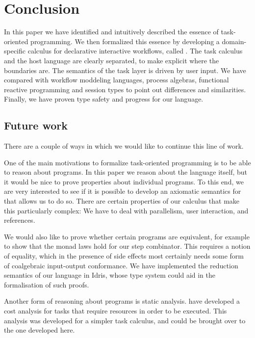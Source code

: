 
\section{Conclusion}

\label{sec:conclusions}

In this paper we have identified and intuitively described the essence of task-oriented programming.
We then formalized this essence by developing a domain-specific calculus for declarative interactive workflows, called \TOPHAT.
The task calculus and the host language are clearly separated, to make explicit where the boundaries are.
The semantics of the task layer is driven by user input.
We have compared \TOPHAT with workflow moddeling languages, process algebras, functional reactive programming and session types to point out differences and similarities.
Finally, we have proven type safety and progress for our language.

\subsection{Future work}

There are a couple of ways in which we would like to continue this line of work.

One of the main motivations to formalize task-oriented programming is to be able to reason about programs.
In this paper we reason about the language itself, but it would be nice to prove properties about individual programs.
To this end, we are very interested to see if it is possible to develop an axiomatic semantics for \TOPHAT that allows us to do so.
There are certain properties of our calculus that make this particularly complex:
We have to deal with parallelism, user interaction, and references.

We would also like to prove whether certain programs are equivalent, for example to show that the monad laws hold for our step combinator.
This requires a notion of equality, which in the presence of side effects most certainly needs some form of coalgebraic input-output conformance.
We have implemented the reduction semantics of our language in Idris, whose type system could aid in the formalisation of such proofs.

Another form of reasoning about programs is static analysis.
\citet{conf/ifl/KlinikJP17} have developed a cost analysis for tasks that require resources in order to be executed.
This analysis was developed for a simpler task calculus, and could be brought over to the one developed here.

